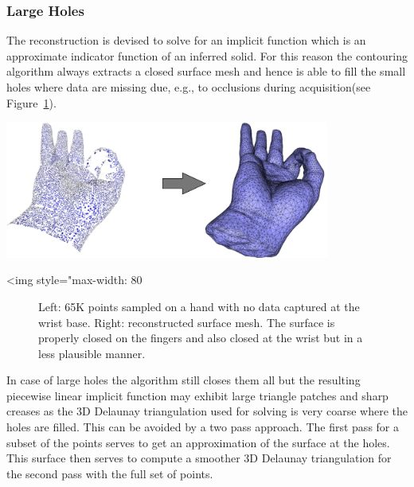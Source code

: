 \subsubsection{Large Holes}

The reconstruction is devised to solve for an implicit function which is an approximate indicator function of an inferred solid. For this reason the contouring algorithm always extracts a closed surface mesh and hence is able to fill the small holes where data are missing due, e.g., to occlusions during acquisition(see Figure~\ref{Surface_reconstruction_points_3-fig-holes_bad}).

\begin{center}
    \begin{ccTexOnly}
        \includegraphics[width=0.8\textwidth]{Surface_reconstruction_points_3/holes_bad}
    \end{ccTexOnly}
    \begin{ccHtmlOnly}
        <img style="max-width: 80%
    \end{ccHtmlOnly}
    \begin{figure}[h]
        \caption{Left: 65K points sampled on a hand with no data
                 captured at the wrist base.
                 Right: reconstructed surface mesh. The surface is
                 properly closed on the fingers and also closed
                 at the wrist but in a less plausible manner.}
        \label{Surface_reconstruction_points_3-fig-holes_bad}
    \end{figure}
\end{center}

 In case of large holes the algorithm still closes them all but the resulting piecewise linear implicit function may exhibit large triangle patches and sharp creases as the 3D Delaunay triangulation used for solving is very coarse where the holes are filled. This can be avoided by a two pass approach. The first pass for a subset of the points serves to get an approximation of the surface at the holes. This surface then serves to compute a smoother 3D Delaunay triangulation for the second pass with the full set of points.

